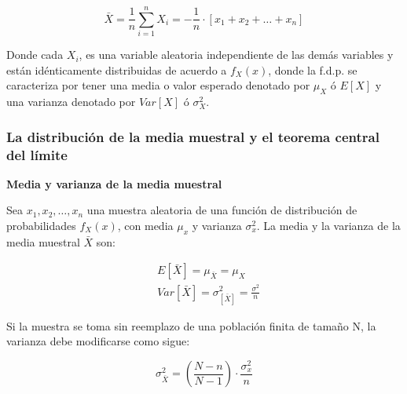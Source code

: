 \begin{equation}
    \bar{X}=\frac{1}{n}\sum_{i=1}^n X_i=-\frac{1}{n}\cdot [x_1+x_2+\dots +x_n]
\end{equation}

Donde cada $X_i$, es una variable aleatoria independiente de las demás variables
y están idénticamente distribuidas de acuerdo a $f_X(x)$, donde la f.d.p. se
caracteriza por tener una media o valor esperado denotado por $\mu_X$ ó $E[X]$ y
una varianza denotado por $Var[X]$ ó $\sigma^2_X$.

\subsubsection{La distribución de la media muestral y el teorema central del límite}

\textbf{Media y varianza de la media muestral}

Sea $x_1,x_2,\dots ,x_n$ una muestra aleatoria de una función de
distribución de probabilidades $f_X(x)$, con media $\mu_x$ y varianza $\sigma^2_x$.
La media y la varianza de la media muestral $\bar{X}$ son:

\begin{align}
     & E[ \bar{X} ]=\mu_{\bar{X}}=\mu_X                       \\
     & Var[ \bar{X} ]=\sigma^{2}_[\bar{X}]=\frac{\sigma^2}{n}
\end{align}

Si la muestra se toma sin reemplazo de una población finita de
tamaño N, la varianza debe modificarse como sigue:

\begin{equation*}
    \sigma^{2}_{\bar{X}}=(\frac{N-n}{N-1})\cdot\frac{\sigma_x^2}{n}
\end{equation*}

